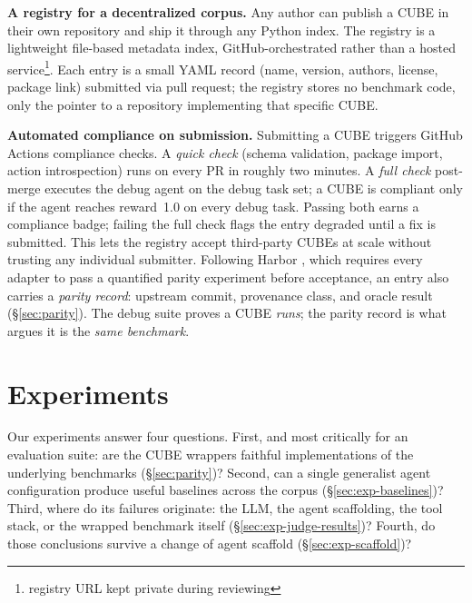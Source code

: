 \documentclass{article}
\newcommand{\mypar}[1]{\par\noindent\textbf{#1}\enspace}
\begin{document}
\mypar{A registry for a decentralized corpus.}
Any author can publish a CUBE in their own repository and ship it through
any Python index. The registry is a lightweight file-based metadata index,
GitHub-orchestrated rather than a hosted service\footnote{registry URL kept private during reviewing}. Each entry is a small YAML
record (name, version, authors, license, package link) submitted via pull
request; the registry stores no benchmark code, only the pointer to a repository implementing that specific CUBE.

\mypar{Automated compliance on submission.}
Submitting a CUBE triggers GitHub Actions compliance checks. A
\emph{quick check} (schema validation, package import, action introspection)
runs on every PR in roughly two minutes. A \emph{full check} post-merge
executes the debug agent on the debug task set; a CUBE is compliant only if
the agent reaches reward~1.0 on every debug task. Passing both earns a
compliance badge; failing the full check flags the entry degraded until a
fix is submitted. This lets the registry accept third-party CUBEs at scale
without trusting any individual submitter.
Following Harbor \citep{Shaw_Harbor_Framework_2025}, which requires every
adapter to pass a quantified parity experiment before acceptance, an entry also
carries a \emph{parity record}: upstream commit, provenance class, and oracle
result (\S\ref{sec:parity}). The debug suite proves a CUBE \emph{runs}; the
parity record is what argues it is the \emph{same benchmark}.


\section{Experiments}
\label{sec:experiments}

Our experiments answer four questions.
First, and most critically for an evaluation suite: are the CUBE wrappers
faithful implementations of the underlying benchmarks (\S\ref{sec:parity})?
Second, can a single generalist agent configuration produce useful baselines
across the corpus (\S\ref{sec:exp-baselines})?
Third, where do its failures originate: the LLM, the agent scaffolding,
the tool stack, or the wrapped benchmark itself (\S\ref{sec:exp-judge-results})?
Fourth, do those conclusions survive a change of agent scaffold
(\S\ref{sec:exp-scaffold})?

\end{document}
